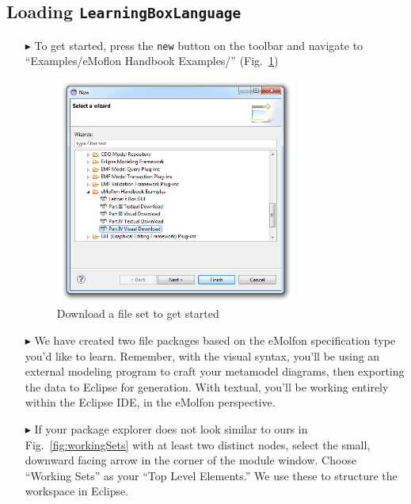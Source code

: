 \subsection{Loading \texttt{LearningBoxLanguage}}
\label{sec:loadSourceMeta}
\begin{itemize}

\item[$\blacktriangleright$] To get started, press the \texttt{new} button on the toolbar and navigate to ``Examples/eMoflon Handbook Examples/''
(Fig.~\ref{fig:downPartIV})

\begin{figure}[htbp]
\begin{center}
  \includegraphics[width=0.75\textwidth]{eclipse_downloadWizardPartIV}
  \caption{Download a file set to get started}
  \label{fig:downPartIV}
\end{center}
\end{figure}

\item[$\blacktriangleright$] We have created two file packages based on the eMolfon specification type you'd like to learn. Remember, with the visual
syntax, you'll be using an external modeling program to craft your metamodel diagrams, then exporting the data to Eclipse for generation. With textual, you'll
be working entirely within the Eclipse IDE, in the eMolfon perspective. 

\item[$\blacktriangleright$] If your package explorer does not look similar to ours in Fig.~\ref{fig:workingSets} with at least two distinct nodes, select the
small, downward facing arrow in the corner of the module window. Choose ``Working Sets'' as your ``Top Level Elements.'' We use these to structure the
workspace in Eclipse.


\end{itemize}
